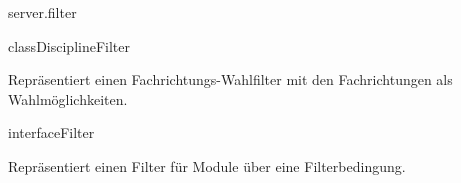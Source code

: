\begin{texdocpackage}{server.filter}
\begin{texdocclass}{class}{DisciplineFilter}
\label{texdoclet:edu.kit.informatik.studyplan.server.filter.DisciplineFilter}
\begin{texdocclassintro}
Repräsentiert einen Fachrichtungs-Wahlfilter mit den Fachrichtungen als Wahlmöglichkeiten.\end{texdocclassintro}
\begin{texdocclassconstructors}
\end{texdocclassconstructors}
\begin{texdocclassmethods}
\end{texdocclassmethods}
\end{texdocclass}



\begin{texdocclass}{interface}{Filter}
\label{texdoclet:edu.kit.informatik.studyplan.server.filter.Filter}
\begin{texdocclassintro}
Repräsentiert einen Filter für Module über eine Filterbedingung.\end{texdocclassintro}
\begin{texdocclassmethods}
\end{texdocclassmethods}
\end{texdocclass}



\end{texdocpackage}
